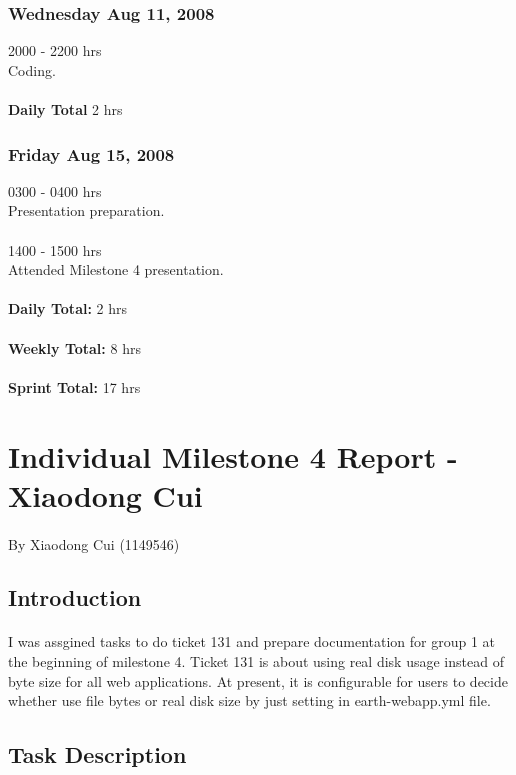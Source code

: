 \documentclass[10pt,a4,oneside]{article}
\begin{document}
\subsubsection*{Wednesday Aug 11, 2008}
2000 - 2200 hrs\\
Coding.\\
\\
\textbf{Daily Total} 2 hrs\\

\subsubsection*{Friday Aug 15, 2008}
0300 - 0400 hrs\\
Presentation preparation.\\
\\
1400 - 1500 hrs\\
Attended Milestone 4 presentation.\\
\\
\textbf{Daily Total:} 2 hrs\\
\\
\textbf{Weekly Total:} 8 hrs\\
\\
\textbf{Sprint Total:} 17 hrs

\newpage
\section{Individual Milestone 4 Report - Xiaodong Cui}

\paragraph{} By Xiaodong Cui (1149546)


\subsection*{Introduction}

\paragraph{}
I was assgined tasks to do ticket 131 and prepare documentation for group 1 at the beginning of milestone 4. Ticket 131 is about using real disk usage instead of byte size for all web applications. At present, it is configurable for users to decide whether use file bytes or real disk size by just setting in earth-webapp.yml file.

\subsection*{Task Description}
\end{document}
